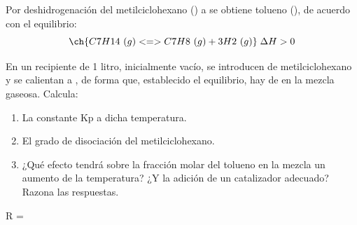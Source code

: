\begin{exerciseEVAU}
    Por deshidrogenación del metilciclohexano () a  se obtiene tolueno (), de acuerdo con el equilibrio:
    \begin{equation*}
        \ch{C7H14\ (g) <=> C7H8\ (g) + 3 H2\ (g)}\; \Delta H > 0
    \end{equation*}

    En un recipiente de 1 litro, inicialmente vacío, se introducen  de metilciclohexano y se calientan a , de forma que, establecido el equilibrio, hay  de  en la mezcla gaseosa. Calcula:
    \begin{enumerate}[label=\letraminuscula]
\item La constante Kp a dicha temperatura.
\item El grado de disociación del metilciclohexano.
\item ¿Qué efecto tendrá sobre la fracción molar del tolueno en la mezcla un aumento de la temperatura? ¿Y la adición de un catalizador adecuado? Razona las respuestas.
    \end{enumerate}
    \datos{} R = \ctegases

    \begin{solu}


\end{solu}
\end{exerciseEVAU}
